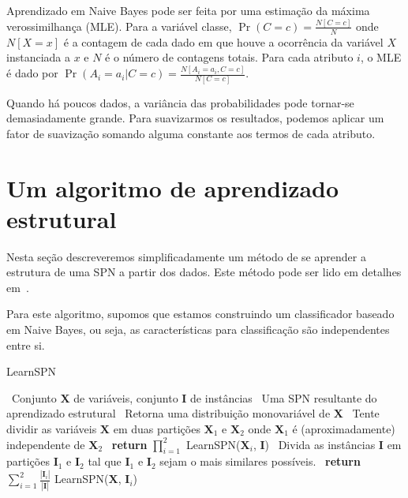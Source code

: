\documentclass{amsart}
\theoremstyle{plain}
\numberwithin{equation}{section}
\newcommand{\set}[1]{\mathbf{#1}}
\begin{document}
Aprendizado em Naive Bayes pode ser feita por uma estimação da máxima verossimilhança (MLE). Para a
variável classe, $\Pr(C=c)=\frac{N[C=c]}{N}$ onde $N[X=x]$ é a contagem de cada dado em que houve
a ocorrência da variável $X$ instanciada a $x$ e $N$ é o número de contagens totais. Para cada
atributo $i$, o MLE é dado por $\Pr(A_i=a_i|C=c)=\frac{N[A_i=a_i,C=c]}{N[C=c]}$.

Quando há poucos dados, a variância das probabilidades pode tornar-se demasiadamente grande. Para
suavizarmos os resultados, podemos aplicar um fator de suavização somando alguma constante aos
termos de cada atributo.

\section{Um algoritmo de aprendizado estrutural}

Nesta seção descreveremos simplificadamente um método de se aprender a estrutura de uma SPN a
partir dos dados. Este método pode ser lido em detalhes em~\cite{gens-domingos}.

Para este algoritmo, supomos que estamos construindo um classificador baseado em Naive Bayes, ou
seja, as características para classificação são independentes entre si.

\begin{algorithm}
  \caption{LearnSPN}\label{learn-alg}
  \begin{algorithmic}[1]
    \Require~Conjunto $\set{X}$ de variáveis, conjunto $\set{I}$ de instâncias
    \Ensure~Uma SPN resultante do aprendizado estrutural
    \If{$|\set{X}|=1$}
      \State~Retorna uma distribuição monovariável de $\set{X}$
    \EndIf
    \State~Tente dividir as variáveis $\set{X}$ em duas partições $\set{X}_1$ e $\set{X}_2$ onde
      $\set{X}_1$ é (aproximadamente) independente de $\set{X}_2$
      \State~\textbf{return} $\prod_{i=1}^2$ LearnSPN($\set{X}_i$, $\set{I}$)
    \Else
      \State~Divida as instâncias $\set{I}$ em partições $\set{I}_1$ e $\set{I}_2$ tal que
        $\set{I}_1$ e $\set{I}_2$ sejam o mais similares possíveis.
      \State~\textbf{return} $\sum_{i=1}^2 \frac{|\set{I}_i|}{|\set{I}|}$ LearnSPN($\set{X}$,
        $\set{I}_i$)
    \EndIf
  \end{algorithmic}
\end{algorithm}
\end{document}
